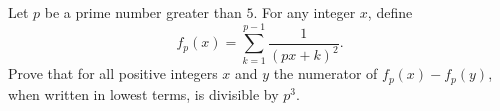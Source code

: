 Let $p$ be a prime number greater than $5$. For any integer $x$, define
\[{f_p}(x) = \sum_{k=1}^{p-1} \frac{1}{(px+k)^2}.\] Prove that for all positive integers $x$ and $y$ the numerator of $f_p(x) - f_p(y)$, when written in lowest terms, is divisible by $p^3$.